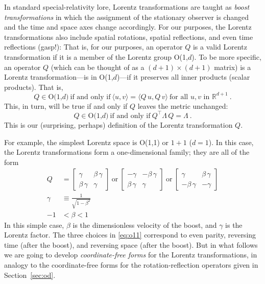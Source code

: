 \documentclass{article}
\newcommand{\inner}[2]{\langle{#1},{#2}\rangle}
\newcommand{\secref}[1]{Section~\ref{#1}}
\begin{document}
In standard special-relativity lore, Lorentz transformations are taught as \emph{boost transformations} in which the assignment of the stationary observer is changed and the time and space axes change accordingly.
For our purposes, the Lorentz transformations also include spatial rotations, spatial reflections, and even time reflections (gasp!):
That is, for our purposes, an operator $Q$ is a valid Lorentz transformation if it is a member of the Lorentz group O(1,$d$).
To be more specific, an operator $Q$ (which can be thought of as a $(d+1)\times(d+1)$ matrix) is a Lorentz transformation---is in O(1,$d$)---if it preserves all inner products (scalar products). 
That is,
\begin{equation}
    Q \in \mbox{O(1,$d$)} ~ \mbox{if and only if} ~ \inner{u}{v}=\inner{Q\,u}{Q\,v} ~ \mbox{for all $u,v$ in $\mathbb{R}^{d+1}$} ~ .
\end{equation}
This, in turn, will be true if and only if $Q$ leaves the metric unchanged:
\begin{equation}
    Q \in \mbox{O(1,$d$)} ~ \mbox{if and only if} ~ Q^\top\Lambda\,Q=\Lambda ~ .
\end{equation}
This is our (surprising, perhaps) definition of the Lorentz transformation $Q$.

For example, the simplest Lorentz space is O(1,1) or $1+1$ ($d=1$).
In this case, the Lorentz transformations form a one-dimensional family; they are all of the form
\begin{align}
    Q &= \begin{bmatrix}\gamma & \beta\,\gamma \\ \beta\,\gamma & \gamma\end{bmatrix} ~\mbox{or}~
    \begin{bmatrix}-\gamma & -\beta\,\gamma \\ \beta\,\gamma & \gamma\end{bmatrix} ~\mbox{or}~
    \begin{bmatrix}\gamma & \beta\,\gamma \\ -\beta\,\gamma & -\gamma\end{bmatrix} \label{eq:o11}
    \\
    \gamma &\equiv \frac{1}{\sqrt{1 - \beta^2}}
    \\
    -1 &< \beta < 1
\end{align}
In this simple case, $\beta$ is the dimensionless velocity of the boost, and $\gamma$ is the Lorentz factor.
The three choices in \eqref{eq:o11} correspond to even parity, reversing time (after the boost), and reversing space (after the boost).
But in what follows we are going to develop \emph{coordinate-free forms} for the Lorentz transformations, in analogy to the coordinate-free forms for the rotation-reflection operators given in \secref{sec:od}.
\end{document}
